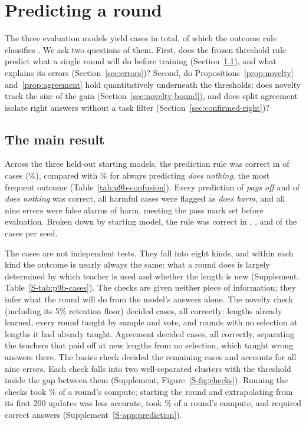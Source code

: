 \section{Predicting a round}
\label{sec:do-the-checks-predict}

The three evaluation models yield \gpNovGainCases{} cases in total, of which
the outcome rule classifies \gpCases{}. We ask two questions of them. First,
does the frozen threshold rule predict what a single round will do before
training (Section~\ref{sec:main-result}), and what explains its errors
(Section~\ref{sec:errors})? Second, do Propositions~\ref{prop:novelty}
and~\ref{prop:agreement} hold quantitatively underneath the thresholds: does
novelty track the size of the gain (Section~\ref{sec:novelty-bound}), and does
split agreement isolate right answers without a task filter
(Section~\ref{sec:confirmed-right})?

\subsection{The main result}
\label{sec:main-result}
\label{sec:which-check}

Across the three held-out starting models, the prediction rule was correct in
\gpCorrect{} of \gpCases{} cases (\gpCorrectPct\%), compared with
\gpDidNothingPct\% for always predicting \emph{does nothing}, the most frequent
outcome (Table~\ref{tab:p9b-confusion}). Every prediction of \emph{pays off}
and of \emph{does nothing} was correct, all \gpHarmful{} harmful cases were
flagged as \emph{does harm}, and all nine errors were false alarms of harm,
meeting the pass mark set before evaluation. Broken down by starting model, the
rule was correct in \gpCorrectModelTwo{}, \gpCorrectModelThree{}, and
\gpCorrectModelFour{} of the \gpCasesModelTwo{} cases per seed.



The \gpCases{} cases are not independent tests. They fall into eight kinds, and
within each kind the outcome is nearly always the same: what a round does is
largely determined by which teacher is used and whether the length is new
(Supplement, Table~\ref{S-tab:p9b-cases}). The checks are given neither piece
of information; they infer what the round will do from the model's answers
alone. The novelty check (including its 5\% retention floor) decided
\gpByNovelty{} cases, all correctly: lengths already learned, every round
taught by sample and vote, and rounds with no selection at lengths it had
already taught. Agreement decided \gpByAgreement{} cases, all correctly,
separating the teachers that paid off at new lengths from no selection, which
taught wrong answers there. The basics check decided the remaining
\gpByBasics{} cases and accounts for all nine errors. Each check falls into two
well-separated clusters with the threshold inside the gap between them
(Supplement, Figure~\ref{S-fig:checks}). Running the checks took
\gpChecksCostAdditionPct\% of a round's compute; starting the round and extrapolating
from its first 200 updates was less accurate, took \gpBaselineCostAdditionPct\% of a
round's compute, and required correct answers
(Supplement~\ref{S-app:prediction}).

